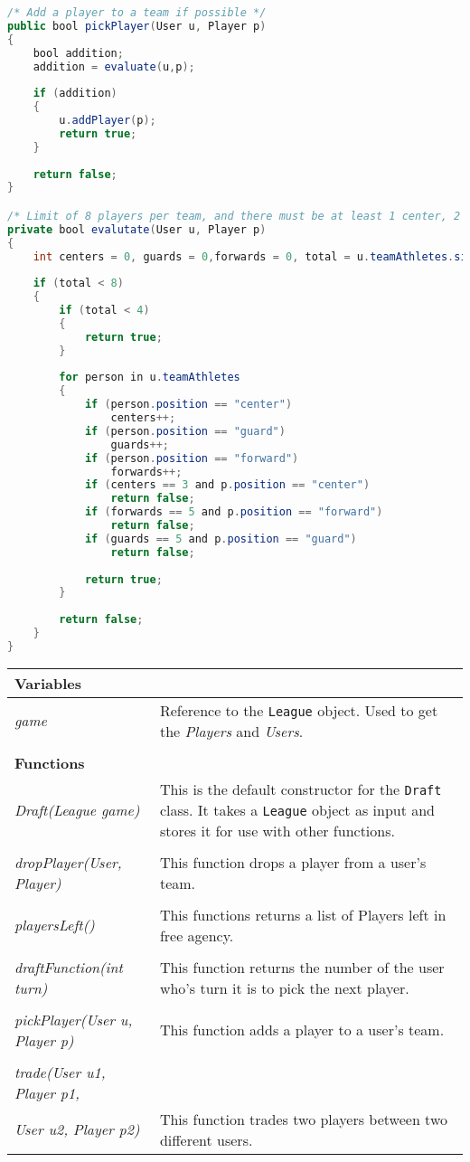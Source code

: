 \documentclass[12pt]{report}
\begin{document}
\begin{lstlisting}[language=Java,label=some-code,caption=Picking a Player]
/* Add a player to a team if possible */
public bool pickPlayer(User u, Player p)
{
	bool addition;
	addition = evaluate(u,p);
	
	if (addition)
	{
		u.addPlayer(p);
		return true;
	}
	
	return false;
}

/* Limit of 8 players per team, and there must be at least 1 center, 2 guards and 2 forwards per team. */
private bool evalutate(User u, Player p)
{
	int centers = 0, guards = 0,forwards = 0, total = u.teamAthletes.size();
	
	if (total < 8)
	{
		if (total < 4)
		{
			return true;
		}
		
		for person in u.teamAthletes
		{
			if (person.position == "center")
				centers++;
			if (person.position == "guard")
				guards++;
			if (person.position == "forward")
				forwards++;
			if (centers == 3 and p.position == "center")
				return false;
			if (forwards == 5 and p.position == "forward")
				return false;
			if (guards == 5 and p.position == "guard")
				return false;
				
			return true;
		}
		
		return false;
	}
}
\end{lstlisting}

\begin{flushleft}
\begin{onehalfspace}
\begin{tabular}[pos]{ l | p{10.5cm} }
\hline
\textbf{Variables} & \\
\hline
\textit{game} & Reference to the \texttt{League} object. Used to get the \textit{Players} and \textit{Users}. \\
\\
\hline
\textbf{Functions} & \\
\hline
\textit{Draft(League game)} & This is the default constructor for the \texttt{Draft} class. It takes a \texttt{League} object as input and stores it for use with other functions. \\
\\
\textit{dropPlayer(User, Player)} & This function drops a player from a user's team. \\
\\
\textit{playersLeft()} & This functions returns a list of Players left in free agency. \\
\\
\textit{draftFunction(int turn)} & This function returns the number of the user who's turn it is to pick the next player. \\
\\
\textit{pickPlayer(User u, Player p)} & This function adds a player to a user's team. \\
\\
\textit{trade(User u1, Player p1,} \\ \textit{User u2, Player p2)} & This function trades two players between two different users.
\\
\hline
\end{tabular}
\end{onehalfspace}
\end{flushleft}
\end{document}
